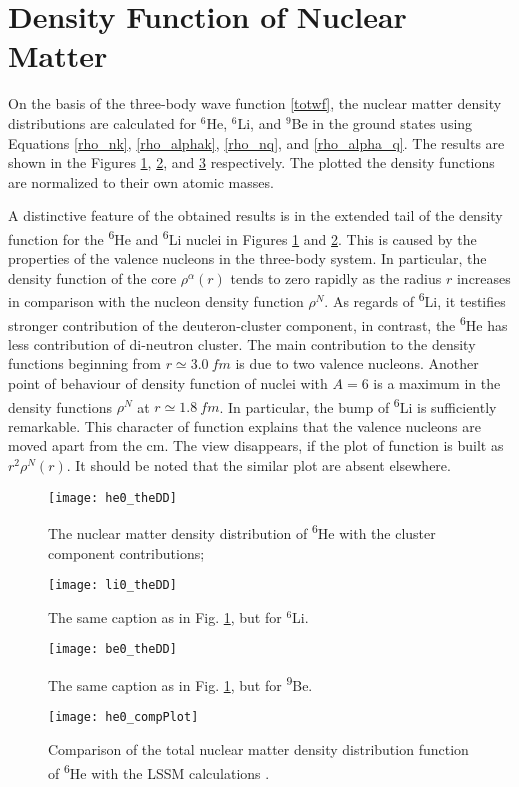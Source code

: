 \documentclass[
12pt, %
oneside, %
english, %
doublespacing, %
doublespacing, %
toctotoc, %
parskip, %
headsepline, %
]{MastersDoctoralThesis} %
\newcommand{\he}{\textsuperscript{6}He\xspace}
\newcommand{\li}{\textsuperscript{6}Li\xspace}
\newcommand{\be}{\textsuperscript{9}Be\xspace}
\begin{document}
\section{Density Function of Nuclear Matter}
On the basis of the three-body wave function \ref{totwf}, the nuclear matter density distributions are calculated for $^6$He, $^6$Li, and $^9$Be in the ground states using Equations \ref{rho_nk}, \ref{rho_alphak}, \ref{rho_nq}, and \ref{rho_alpha_q}. The results are shown in the Figures \ref{he0_theDD}, \ref{li0_theDD}, and \ref{be0_theDD} respectively.
The plotted the density functions are normalized to their own atomic masses. 


A distinctive feature of the obtained results is in the extended tail of the density function for the \he and \li nuclei in Figures \ref{he0_theDD} and \ref{li0_theDD}. 
This is caused by the properties of the valence nucleons in the three-body system. 
In particular, the density function of the core $\rho^\alpha(r)$ tends to zero rapidly as the radius $r$ increases in comparison with the nucleon density function $\rho^{N}$. 
As regards of \li, it testifies stronger contribution of the deuteron-cluster component, in contrast, the \he has less contribution of di-neutron cluster.
The main contribution to the density functions beginning from $r \simeq 3.0~fm$ is due to two valence nucleons.
Another point of behaviour of density function of nuclei with $A=6$ is a maximum in the density functions $\rho^N$ at $r \simeq 1.8~ fm $. In particular, the bump of \li is sufficiently remarkable. This character of function explains that the valence nucleons are moved apart from the cm.  The view disappears, if the plot of function is built as $r^2 \rho^N(r)$. It should be noted that the similar plot are absent elsewhere.

\begin{figure}
\centering
\texttt{[image: he0\_theDD]}
\decoRule
\caption{    The nuclear matter density distribution of \he with the cluster component contributions;}
\label{he0_theDD}
\end{figure}
\begin{figure}
\centering
\texttt{[image: li0\_theDD]}
\decoRule
\caption{    The same caption as in Fig. \ref{he0_theDD}, but for $^6$Li. }
\label{li0_theDD}
\end{figure}
\begin{figure}
\centering
\texttt{[image: be0\_theDD]}
\decoRule
\caption{    The same caption as in Fig. \ref{he0_theDD}, but for \be.}
\label{be0_theDD}
\end{figure}
\begin{figure}
\centering
\texttt{[image: he0\_compPlot]}
\decoRule
\caption{    Comparison of the total nuclear matter density distribution function of \he with the LSSM calculations \cite{antonov2005charge}. }
\label{he0_compPlot}
\end{figure}
\end{document}
